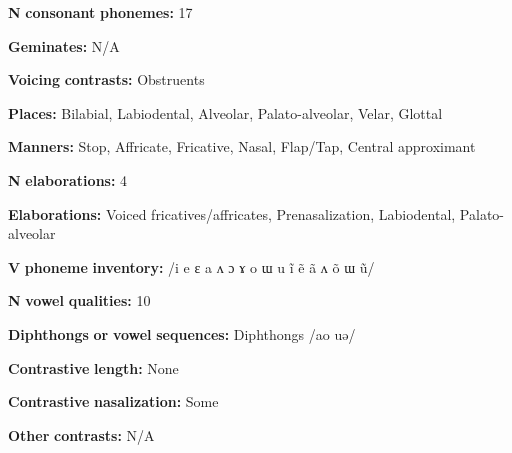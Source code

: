 \begin{styleBody}
\textbf{N} \textbf{consonant} \textbf{phonemes:} 17
\end{styleBody}

\begin{styleBody}
\textbf{Geminates:} N/A
\end{styleBody}

\begin{styleBody}
\textbf{Voicing} \textbf{contrasts:} Obstruents
\end{styleBody}

\begin{styleBody}
\textbf{Places:} Bilabial, Labiodental, Alveolar, Palato-alveolar, Velar, Glottal
\end{styleBody}

\begin{styleBody}
\textbf{Manners:} Stop, Affricate, Fricative, Nasal, Flap/Tap, Central approximant
\end{styleBody}

\begin{styleBody}
\textbf{N} \textbf{elaborations:} 4
\end{styleBody}

\begin{styleBody}
\textbf{Elaborations:} Voiced fricatives/affricates, Prenasalization, Labiodental, Palato-alveolar
\end{styleBody}

\begin{styleBody}
\textbf{V} \textbf{phoneme} \textbf{inventory:} /i e ɛ a ʌ ɔ ɤ o ɯ u ĩ ẽ ã ʌ õ ɯ ũ/
\end{styleBody}

\begin{styleBody}
\textbf{N} \textbf{vowel} \textbf{qualities:} 10
\end{styleBody}

\begin{styleBody}
\textbf{Diphthongs} \textbf{or} \textbf{vowel} \textbf{sequences:} Diphthongs /ao uə/
\end{styleBody}

\begin{styleBody}
\textbf{Contrastive} \textbf{length:} None
\end{styleBody}

\begin{styleBody}
\textbf{Contrastive} \textbf{nasalization:} Some
\end{styleBody}

\begin{styleBody}
\textbf{Other} \textbf{contrasts:} N/A
\end{styleBody}

